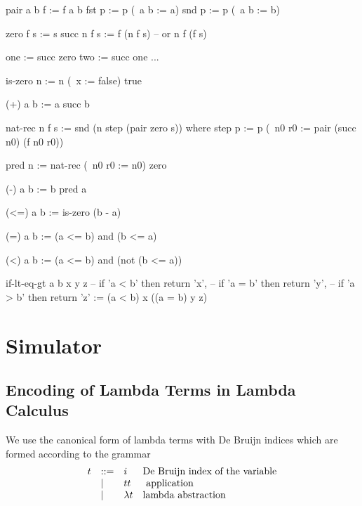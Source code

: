 \documentclass[12pt]{article}
\begin{document}
\begin{lam}
    pair a b f := f a b
    fst  p     := p (\ a b := a)
    snd  p     := p (\ a b := b)
\end{lam}

\begin{lam}
    zero    f s  := s
    succ n  f s  := f (n f s) -- or n f (f s)

    one := succ zero
    two := succ one
    ...

    is-zero n :=
        n (\ x := false) true

    (+) a b := a succ b

    nat-rec n f s :=
        snd (n step (pair zero s)) where
          step p :=
            p (\ n0 r0 := pair (succ n0) (f n0 r0))


    pred n :=
        nat-rec (\ n0 r0 := n0) zero

    (-) a b := b pred a

    (<=) a b := is-zero (b - a)

    (=)  a b := (a <= b) and (b <= a)

    (<)  a b := (a <= b) and (not (b <= a))

    if-lt-eq-gt a b x y z
        -- if 'a < b' then return 'x',
        -- if 'a = b' then return 'y',
        -- if 'a > b' then return 'z'
    :=
        (a < b) x ((a = b) y z)
\end{lam}












\section{Simulator}





\subsection{Encoding of Lambda Terms in Lambda Calculus}

We use the canonical form of lambda terms with De Bruijn indices which are
formed according to the grammar
$$
\vertlist{
    t &::=&
    i 
    & \text{De Bruijn index of the variable}
    \\
    &\mid&
    t t &
     \text{application}
    \\
    &\mid&
    \lambda t
    &\text{lambda abstraction}
}
$$
\end{document}
